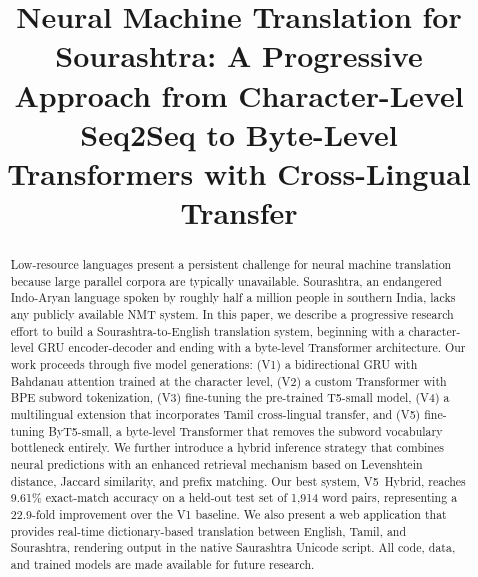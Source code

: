 \documentclass[conference]{IEEEtran}
\begin{document}
\title{Neural Machine Translation for Sourashtra: A Progressive Approach from Character-Level Seq2Seq to Byte-Level Transformers with Cross-Lingual Transfer}

\author{
\and
{}
}

\maketitle


\begin{abstract}
Low-resource languages present a persistent challenge for neural machine translation because large parallel corpora are typically unavailable. Sourashtra, an endangered Indo-Aryan language spoken by roughly half a million people in southern India, lacks any publicly available NMT system. In this paper, we describe a progressive research effort to build a Sourashtra-to-English translation system, beginning with a character-level GRU encoder-decoder and ending with a byte-level Transformer architecture. Our work proceeds through five model generations: (V1) a bidirectional GRU with Bahdanau attention trained at the character level, (V2) a custom Transformer with BPE subword tokenization, (V3) fine-tuning the pre-trained T5-small model, (V4) a multilingual extension that incorporates Tamil cross-lingual transfer, and (V5) fine-tuning ByT5-small, a byte-level Transformer that removes the subword vocabulary bottleneck entirely. We further introduce a hybrid inference strategy that combines neural predictions with an enhanced retrieval mechanism based on Levenshtein distance, Jaccard similarity, and prefix matching. Our best system, V5~Hybrid, reaches 9.61\% exact-match accuracy on a held-out test set of 1,914 word pairs, representing a 22.9-fold improvement over the V1 baseline. We also present a web application that provides real-time dictionary-based translation between English, Tamil, and Sourashtra, rendering output in the native Saurashtra Unicode script. All code, data, and trained models are made available for future research.
\end{abstract}
\end{document}
